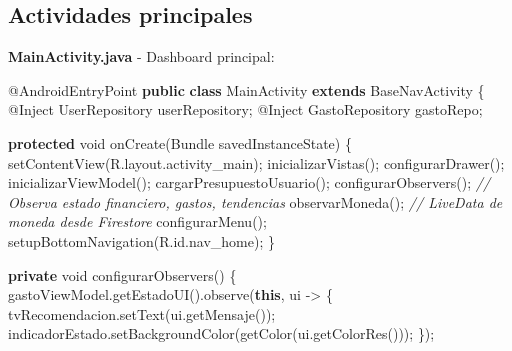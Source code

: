 \documentclass[
  spanish,
  11pt,
  paper=a4,
  ,captions=tableheading
]{scrartcl}
\newenvironment{Shaded}{}{}
\newcommand{\AttributeTok}[1]{\textcolor[rgb]{0.49,0.56,0.16}{#1}}
\newcommand{\CommentTok}[1]{\textcolor[rgb]{0.38,0.63,0.69}{\textit{#1}}}
\newcommand{\DataTypeTok}[1]{\textcolor[rgb]{0.56,0.13,0.00}{#1}}
\newcommand{\FunctionTok}[1]{\textcolor[rgb]{0.02,0.16,0.49}{#1}}
\newcommand{\KeywordTok}[1]{\textcolor[rgb]{0.00,0.44,0.13}{\textbf{#1}}}
\newcommand{\NormalTok}[1]{#1}
\newcommand{\OperatorTok}[1]{\textcolor[rgb]{0.40,0.40,0.40}{#1}}
\begin{document}
\hypertarget{actividades-principales}{%
\subsection{Actividades principales}\label{actividades-principales}}

\textbf{MainActivity.java} - Dashboard principal:

\begin{Shaded}
\begin{Highlighting}[]
\AttributeTok{@AndroidEntryPoint}
\KeywordTok{public} \KeywordTok{class}\NormalTok{ MainActivity }\KeywordTok{extends}\NormalTok{ BaseNavActivity }\OperatorTok{\{}
    \AttributeTok{@Inject}\NormalTok{ UserRepository userRepository}\OperatorTok{;}
    \AttributeTok{@Inject}\NormalTok{ GastoRepository gastoRepo}\OperatorTok{;}

    \KeywordTok{protected} \DataTypeTok{void} \FunctionTok{onCreate}\OperatorTok{(}\NormalTok{Bundle savedInstanceState}\OperatorTok{)} \OperatorTok{\{}
        \FunctionTok{setContentView}\OperatorTok{(}\NormalTok{R}\OperatorTok{.}\FunctionTok{layout}\OperatorTok{.}\FunctionTok{activity\_main}\OperatorTok{);}
        \FunctionTok{inicializarVistas}\OperatorTok{();}
        \FunctionTok{configurarDrawer}\OperatorTok{();}
        \FunctionTok{inicializarViewModel}\OperatorTok{();}
        \FunctionTok{cargarPresupuestoUsuario}\OperatorTok{();}
        \FunctionTok{configurarObservers}\OperatorTok{();}  \CommentTok{// Observa estado financiero, gastos, tendencias}
        \FunctionTok{observarMoneda}\OperatorTok{();}       \CommentTok{// LiveData de moneda desde Firestore}
        \FunctionTok{configurarMenu}\OperatorTok{();}
        \FunctionTok{setupBottomNavigation}\OperatorTok{(}\NormalTok{R}\OperatorTok{.}\FunctionTok{id}\OperatorTok{.}\FunctionTok{nav\_home}\OperatorTok{);}
    \OperatorTok{\}}

    \KeywordTok{private} \DataTypeTok{void} \FunctionTok{configurarObservers}\OperatorTok{()} \OperatorTok{\{}
\NormalTok{        gastoViewModel}\OperatorTok{.}\FunctionTok{getEstadoUI}\OperatorTok{().}\FunctionTok{observe}\OperatorTok{(}\KeywordTok{this}\OperatorTok{,}\NormalTok{ ui }\OperatorTok{{-}\textgreater{}} \OperatorTok{\{}
\NormalTok{            tvRecomendacion}\OperatorTok{.}\FunctionTok{setText}\OperatorTok{(}\NormalTok{ui}\OperatorTok{.}\FunctionTok{getMensaje}\OperatorTok{());}
\NormalTok{            indicadorEstado}\OperatorTok{.}\FunctionTok{setBackgroundColor}\OperatorTok{(}\FunctionTok{getColor}\OperatorTok{(}\NormalTok{ui}\OperatorTok{.}\FunctionTok{getColorRes}\OperatorTok{()));}
        \OperatorTok{\});}


\end{Highlighting}
\end{Shaded}
\end{document}
